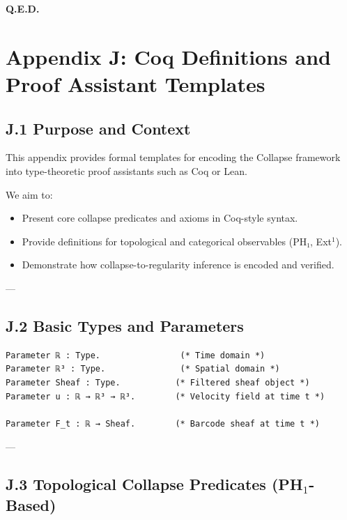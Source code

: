 \documentclass[11pt]{article}
\begin{document}
\begin{flushright}
\textbf{Q.E.D.}
\end{flushright}




\section*{Appendix J: Coq Definitions and Proof Assistant Templates}

\subsection*{J.1 Purpose and Context}

This appendix provides formal templates for encoding the Collapse framework  
into type-theoretic proof assistants such as Coq or Lean.

We aim to:
\begin{itemize}
  \item Present core collapse predicates and axioms in Coq-style syntax.
  \item Provide definitions for topological and categorical observables (PH₁, Ext$^1$).
  \item Demonstrate how collapse-to-regularity inference is encoded and verified.
\end{itemize}

---

\subsection*{J.2 Basic Types and Parameters}

\begin{lstlisting}[language=Coq]
Parameter ℝ : Type.                (* Time domain *)
Parameter ℝ³ : Type.               (* Spatial domain *)
Parameter Sheaf : Type.           (* Filtered sheaf object *)
Parameter u : ℝ → ℝ³ → ℝ³.        (* Velocity field at time t *)

Parameter F_t : ℝ → Sheaf.        (* Barcode sheaf at time t *)
\end{lstlisting}

---

\subsection*{J.3 Topological Collapse Predicates (PH\(_1\)-Based)}
\end{document}
